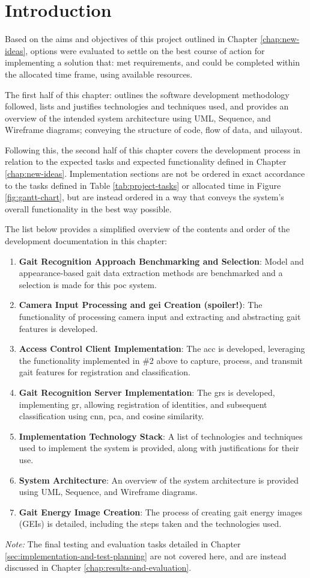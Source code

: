 \section{Introduction}
\label{sec:implementation-introduction}

Based on the aims and objectives of this project outlined in Chapter \ref{chap:new-ideas}, options were evaluated to settle on the best course of action for implementing a solution that: met requirements, and could be completed within the allocated time frame, using available resources.

The first half of this chapter: outlines the software development methodology followed, lists and justifies technologies and techniques used, and provides an overview of the intended system architecture using UML, Sequence, and Wireframe diagrams; conveying the structure of code, flow of data, and \ac{ui}layout.

Following this, the second half of this chapter covers the development process in relation to the expected tasks and expected functionality defined in Chapter \ref{chap:new-ideas}.
Implementation sections are not be ordered in exact accordance to the tasks defined in Table \ref{tab:project-tasks} or allocated time in Figure \ref{fig:gantt-chart}, but are instead ordered in a way that conveys the system's overall functionality in the best way possible.

The list below provides a simplified overview of the contents and order of the development documentation in this chapter:

\begin{enumerate}
    \item \textbf{Gait Recognition Approach Benchmarking and Selection}: Model and appearance-based gait data extraction methods are benchmarked and a selection is made for this \ac{poc} system.
    \item \textbf{Camera Input Processing and \ac{gei} Creation (spoiler!)}: The functionality of processing camera input and extracting and abstracting gait features is developed.
    \item \textbf{Access Control Client Implementation}: The \ac{acc} is developed, leveraging the functionality implemented in \#2 above to capture, process, and transmit gait features for registration and classification.
    \item \textbf{Gait Recognition Server Implementation}: The \ac{grs} is developed, implementing \ac{gr}, allowing registration of identities, and subsequent classification using \ac{cnn}, \ac{pca}, and cosine similarity.	\item \textbf{Implementation Technology Stack}: A list of technologies and techniques used to implement the system is provided, along with justifications for their use.	\item \textbf{System Architecture}: An overview of the system architecture is provided using UML, Sequence, and Wireframe diagrams.	\item \textbf{Gait Energy Image Creation}: The process of creating gait energy images (GEIs) is detailed, including the steps taken and the technologies used.
\end{enumerate}

\textit{Note:} The final testing and evaluation tasks detailed in Chapter \ref{sec:implementation-and-test-planning} are not covered here, and are instead discussed in Chapter \ref{chap:results-and-evaluation}.

